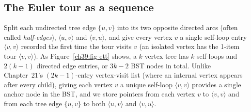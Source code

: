 \subsection*{The Euler tour as a sequence}

Split each undirected tree edge $\{u,v\}$ into its two opposite directed arcs (often
called \emph{half-edges}), $\langle u,v\rangle$ and $\langle v,u\rangle$, and give
every vertex $v$ a single self-loop entry $\langle v,v\rangle$ recorded the first time
the tour visits $v$ (an isolated vertex has the 1-item tour $\langle v,v\rangle$). As
Figure~\ref{ch39:fig-ett} shows, a $k$-vertex tree has $k$ self-loops and $2(k-1)$
directed edge entries, or $3k-2$ BST nodes in total. Unlike Chapter~21's $(2k-1)$-entry
vertex-visit list (where an internal vertex appears after every child), giving each
vertex $v$ a unique self-loop $\langle v,v\rangle$ provides a single anchor node in the
BST, and we store pointers from each vertex $v$ to $\langle v,v\rangle$ and from each
tree edge $\{u,v\}$ to both $\langle u,v\rangle$ and $\langle v,u\rangle$.

